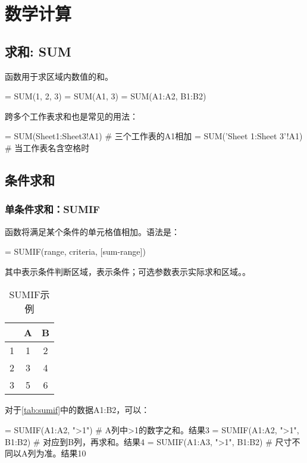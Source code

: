 \chapter{数学计算}
\section{求和: SUM}
函数用于求区域内数值的和。
\begin{excode}
= SUM(1, 2, 3)   
= SUM(A1, 3)
= SUM(A1:A2, B1:B2)
\end{excode}

跨多个工作表求和也是常见的用法：
\begin{excode}
= SUM(Sheet1:Sheet3!A1)  # 三个工作表的A1相加
= SUM('Sheet 1:Sheet 3'!A1)  # 当工作表名含空格时
\end{excode}

\section{条件求和}
\subsection{单条件求和：SUMIF}
函数将满足某个条件的单元格值相加。语法是：
\begin{syntax}
= SUMIF(range, criteria, [sum-range])
\end{syntax}

其中表示条件判断区域，表示条件；可选参数表示实际求和区域。。

\begin{table}[!hbt]
    \centering
    \caption{SUMIF示例}\label{tab:sumif}
    \begin{tabular}{c|cc}
    \hline
      & A & B \\
    \hline
    1 & 1 & 2 \\
    2 & 3 & 4 \\
    3 & 5 & 6 \\
    \hline
    \end{tabular}
\end{table}

对于\autoref{tab:sumif}中的数据A1:B2，可以：
\begin{excode}
= SUMIF(A1:A2, ">1")  # A列中>1的数字之和。结果3
= SUMIF(A1:A2, ">1", B1:B2)  # 对应到B列，再求和。结果4
= SUMIF(A1:A3, ">1", B1:B2)  # 尺寸不同以A列为准。结果10
\end{excode}

